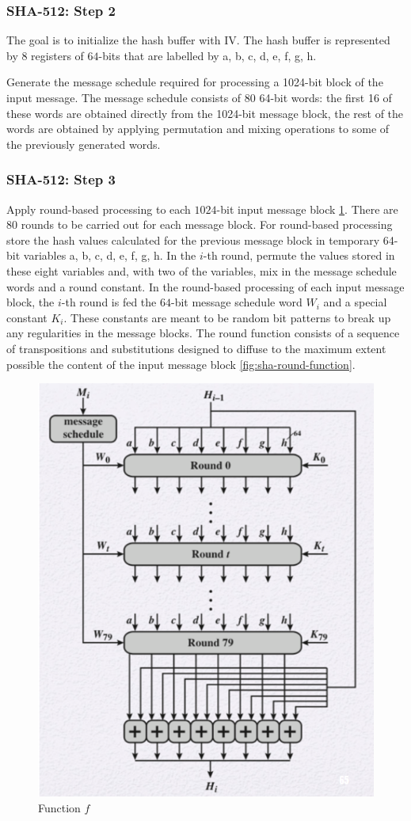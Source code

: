 \subsubsection{SHA-512: Step 2}

The goal is to initialize the hash buffer with IV. The hash buffer is represented by $8$ registers of $64$-bits that are labelled by a, b, c, d, e, f, g, h.

Generate the message schedule required for processing a 1024-bit block of the input message. The message schedule consists of 80 64-bit words: the first 16 of these words are obtained directly from the 1024-bit message block, the rest of the words are obtained by applying permutation and mixing operations to some of the previously generated words. 

\subsubsection{SHA-512: Step 3}

Apply round-based processing to each $1024$-bit input message block \ref{fig:sha-round2}.  There are $80$ rounds to be carried out for each message block. For round-based processing store the hash values calculated for the previous message block in temporary 64-bit variables a, b, c, d, e, f, g, h. In the $i$-th round, permute the values stored in these eight variables and, with two of the variables, mix in the message schedule words and a round constant. 
In the round-based processing of each input message block, the $i$-th round is fed the $64$-bit message schedule word $W_i$ and a special constant $K_i$. These constants are meant to be random bit patterns to break up any regularities in the message blocks. The round function consists of a sequence of transpositions and substitutions designed to diffuse to the maximum extent possible the content of the input message block \ref{fig:sha-round-function}.

\begin{figure}
	\centering
	\includegraphics[width=0.7\linewidth]{Images/Chapter6/sha-round2}
	\caption{Function $f$}
	\label{fig:sha-round2}
\end{figure}

